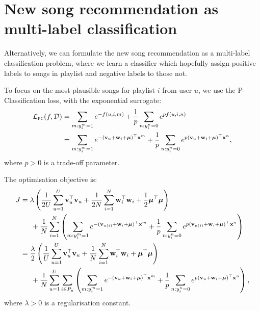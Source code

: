 \section{New song recommendation as multi-label classification}

Alternatively, we can formulate the new song recommendation as a multi-label classification problem,
where we learn a classifier which hopefully assign positive labels to songs in playlist and negative labels to those not.

To focus on the most plausible songs for playlist $i$ from user $u$,
we use the P-Classification loss, with the exponential surrogate:
\begin{equation*}
\begin{aligned}
\mathcal{L}_\textsc{pc}(f, \mathcal{D}) 
&= \sum_{m: y_i^m = 1} e^{-f(u, i, m)} + \frac{1}{p} \sum_{n: y_i^n = 0} e^{p f(u, i, n)} \\
&= \sum_{m: y_i^m = 1} e^{-(\mathbf{v}_u + \mathbf{w}_i + \bm{\mu})^\top \mathbf{x}^m} 
   + \frac{1}{p} \sum_{n: y_i^n = 0} e^{p (\mathbf{v}_u + \mathbf{w}_i + \bm{\mu})^\top \mathbf{x}^n},
\end{aligned}
\end{equation*}
where $p > 0$ is a trade-off parameter.

The optimisation objective is:
\begin{equation*}
\begin{aligned}
J &= \lambda \left( \frac{1}{2 U} \sum_{u=1}^U \mathbf{v}_u^\top \mathbf{v}_u 
     + \frac{1}{2 N} \sum_{i=1}^N \mathbf{w}_i^\top \mathbf{w}_i + \frac{1}{2} \bm{\mu}^\top \bm{\mu} \right) \\
& \hspace{1.5em}
     + \frac{1}{N} \sum_{i=1}^N \left( \sum_{m: y_i^m = 1} e^{-(\mathbf{v}_{u(i)} + \mathbf{w}_i + \bm{\mu})^\top \mathbf{x}^m} 
     + \frac{1}{p} \sum_{n: y_i^n = 0} e^{p (\mathbf{v}_{u(i)} + \mathbf{w}_i + \bm{\mu})^\top \mathbf{x}^n} \right) \\
&= \frac{\lambda}{2} \left( \frac{1}{U} \sum_{u=1}^U \mathbf{v}_u^\top \mathbf{v}_u 
     + \frac{1}{N} \sum_{i=1}^N \mathbf{w}_i^\top \mathbf{w}_i + \bm{\mu}^\top \bm{\mu} \right) \\
& \hspace{1.5em}
     + \frac{1}{N} \sum_{u=1}^U \sum_{i \in P_u} \left(
       \sum_{m: y_i^m = 1} e^{-(\mathbf{v}_{u} + \mathbf{w}_i + \bm{\mu})^\top \mathbf{x}^m} 
       + \frac{1}{p} \sum_{n: y_i^n = 0} e^{p (\mathbf{v}_{u} + \mathbf{w}_i + \bm{\mu})^\top \mathbf{x}^n} \right),
\end{aligned}
\end{equation*}
where $\lambda > 0$ is a regularisation constant.

